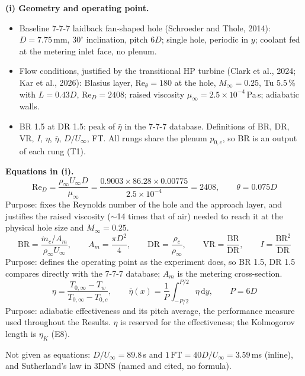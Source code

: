 \documentclass[10pt]{article}
\begin{document}
\textbf{(i) Geometry and operating point.}
\begin{itemize}
\item Baseline 7-7-7 laidback fan-shaped hole (Schroeder and Thole, 2014): $D=7.75$\,mm, $30^\circ$
  inclination, pitch $6D$; single hole, periodic in $y$; coolant fed at the metering inlet face, no plenum.
\item Flow conditions, justified by the transitional HP turbine (Clark et al., 2024; Kar et al., 2026): Blasius
  layer, $\mathrm{Re}_\theta=180$ at the hole, $M_\infty=0.25$, Tu 5.5\,\% with $L=0.43D$, $\mathrm{Re}_D=2408$;
  raised viscosity $\mu_\infty=2.5\times10^{-4}$\,Pa\,s; adiabatic walls.
\item BR 1.5 at DR 1.5: peak of $\bar\eta$ in the 7-7-7 database. Definitions of BR, DR, VR, $I$, $\eta$,
  $\bar\eta$, $D/U_\infty$, FT. All rungs share the plenum $p_{0,c}$, so BR is an output of each rung (T1).
\end{itemize}

\textbf{Equations in (i).}
\begin{equation}
\mathrm{Re}_D=\frac{\rho_\infty U_\infty D}{\mu_\infty}=\frac{0.9003\times86.28\times0.00775}{2.5\times10^{-4}}=2408,
\qquad \theta=0.075D
\tag{E3}
\end{equation}
Purpose: fixes the Reynolds number of the hole and the approach layer, and justifies the raised viscosity
($\sim$14 times that of air) needed to reach it at the physical hole size and $M_\infty=0.25$.
\begin{equation}
\mathrm{BR}=\frac{\dot m_c/A_m}{\rho_\infty U_\infty},\qquad A_m=\frac{\pi D^2}{4},\qquad
\mathrm{DR}=\frac{\rho_c}{\rho_\infty},\qquad
\mathrm{VR}=\frac{\mathrm{BR}}{\mathrm{DR}},\qquad I=\frac{\mathrm{BR}^2}{\mathrm{DR}}
\tag{E4}
\end{equation}
Purpose: defines the operating point as the experiment does, so BR 1.5, DR 1.5 compares directly with the
7-7-7 database; $A_m$ is the metering cross-section.
\begin{equation}
\eta=\frac{T_{0,\infty}-T_w}{T_{0,\infty}-T_{0,c}},\qquad
\bar\eta(x)=\frac{1}{P}\int_{-P/2}^{P/2}\eta\,\mathrm{d}y,\qquad P=6D
\tag{E5}
\end{equation}
Purpose: adiabatic effectiveness and its pitch average, the performance measure used throughout the Results.
$\eta$ is reserved for the effectiveness; the Kolmogorov length is $\eta_K$ (E8).

Not given as equations: $D/U_\infty=89.8$\,\textmu s and $1\,\mathrm{FT}=40D/U_\infty=3.59$\,ms (inline), and
Sutherland's law in 3DNS (named and cited, no formula).
\end{document}
